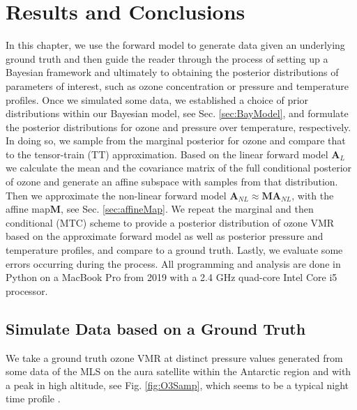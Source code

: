 \chapter{Results and Conclusions}
\label{ch:res}
In this chapter, we use the forward model to generate data given an underlying ground truth and then guide the reader through the process of setting up a Bayesian framework and ultimately to obtaining the posterior distributions of parameters of interest, such as ozone concentration or pressure and temperature profiles.
Once we simulated some data, we established a choice of prior distributions within our Bayesian model, see Sec. \ref{sec:BayModel}, and formulate the posterior distributions for ozone and pressure over temperature, respectively.
In doing so, we sample from the marginal posterior for ozone and compare that to the tensor-train (TT) approximation.
Based on the linear forward model $\bm{A}_L$ we calculate the mean and the covariance matrix of the full conditional posterior of ozone and generate an affine subspace with samples from that distribution.
Then we approximate the non-linear forward model $\bm{A}_{NL} \approx \bm{M} \bm{A}_{NL}$, with the affine map$\bm{M}$, see Sec. \ref{sec:affineMap}.
We repeat the marginal and then conditional (MTC) scheme to provide a posterior distribution of ozone VMR based on the approximate forward model as well as posterior pressure and temperature profiles, and compare to a ground truth.
Lastly, we evaluate some errors occurring during the process.
All programming and analysis are done in Python on a MacBook Pro from 2019 with a 2.4 GHz quad-core Intel Core i5 processor.

\section{Simulate Data based on a Ground Truth}


We take a ground truth ozone VMR at distinct pressure values generated from some data \cite{MLSdata} of the MLS on the aura satellite within the Antarctic region and with a peak in high altitude, see Fig. \ref{fig:O3Samp}, which seems to be a typical night time profile \cite{Lee2020NightOzone}.

